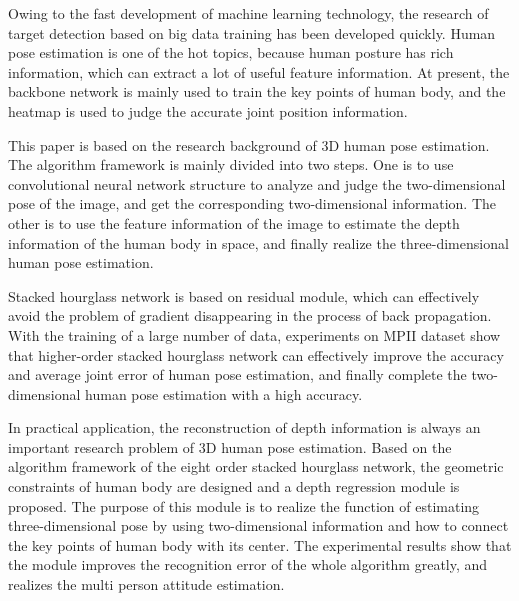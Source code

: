 
\begin{englishabstract}

Owing to the fast development of machine learning technology, the research of target detection based on big data training has been developed quickly. Human pose estimation is one of the hot topics, because human posture has rich information, which can extract a lot of useful feature information. At present, the backbone network is mainly used to train the key points of human body, and the heatmap is used to judge the accurate joint position information.

This paper is based on the research background of 3D human pose estimation. The algorithm framework is mainly divided into two steps. One is to use convolutional neural network structure to analyze and judge the two-dimensional pose of the image, and get the corresponding two-dimensional information. The other is to use the feature information of the image to estimate the depth information of the human body in space, and finally realize the three-dimensional human pose estimation.

Stacked hourglass network is based on residual module, which can effectively avoid the problem of gradient disappearing in the process of back propagation. With the training of a large number of data, experiments on MPII dataset show that higher-order stacked hourglass network can effectively improve the accuracy and average joint error of human pose estimation, and finally complete the two-dimensional human pose estimation with a high accuracy.

In practical application, the reconstruction of depth information is always an important research problem of 3D human pose estimation. Based on the algorithm framework of the eight order stacked hourglass network, the geometric constraints of human body are designed and a depth regression module is proposed. The purpose of this module is to realize the function of estimating three-dimensional pose by using two-dimensional information and how to connect the key points of human body with its center. The experimental results show that the module improves the recognition error of the whole algorithm greatly, and realizes the multi person attitude estimation.
	
\end{englishabstract}


